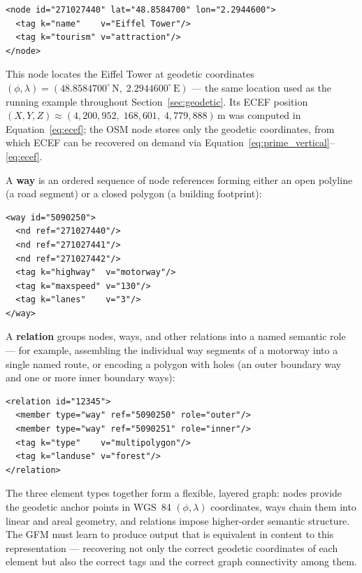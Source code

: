 \documentclass{book}
\begin{document}
\begin{verbatim}
<node id="271027440" lat="48.8584700" lon="2.2944600">
  <tag k="name"    v="Eiffel Tower"/>
  <tag k="tourism" v="attraction"/>
</node>
\end{verbatim}

\noindent This node locates the Eiffel Tower at geodetic coordinates
$(\phi, \lambda) = (48.8584700^\circ\,\text{N},\;
2.2944600^\circ\,\text{E})$ --- the same location used as the running
example throughout Section~\ref{sec:geodetic}.  Its ECEF position
$(X, Y, Z) \approx (4{,}200{,}952,\; 168{,}601,\; 4{,}779{,}888)$\,m
was computed in Equation~\eqref{eq:ecef}; the OSM node stores only
the geodetic coordinates, from which ECEF can be recovered on demand
via Equation~\eqref{eq:prime_vertical}--\eqref{eq:ecef}.

\noindent A \textbf{way} is an ordered sequence of node references
forming either an open polyline (a road segment) or a closed polygon
(a building footprint):

\begin{verbatim}
<way id="5090250">
  <nd ref="271027440"/>
  <nd ref="271027441"/>
  <nd ref="271027442"/>
  <tag k="highway"  v="motorway"/>
  <tag k="maxspeed" v="130"/>
  <tag k="lanes"    v="3"/>
</way>
\end{verbatim}

\noindent A \textbf{relation} groups nodes, ways, and other relations
into a named semantic role --- for example, assembling the individual
way segments of a motorway into a single named route, or encoding a
polygon with holes (an outer boundary way and one or more inner
boundary ways):

\begin{verbatim}
<relation id="12345">
  <member type="way" ref="5090250" role="outer"/>
  <member type="way" ref="5090251" role="inner"/>
  <tag k="type"    v="multipolygon"/>
  <tag k="landuse" v="forest"/>
</relation>
\end{verbatim}

\noindent The three element types together form a flexible, layered
graph: nodes provide the geodetic anchor points in WGS~84
$(\phi, \lambda)$ coordinates, ways chain them into linear and areal
geometry, and relations impose higher-order semantic structure.  The
GFM must learn to produce output that is equivalent in content to
this representation --- recovering not only the correct geodetic
coordinates of each element but also the correct tags and the correct
graph connectivity among them.
\end{document}
